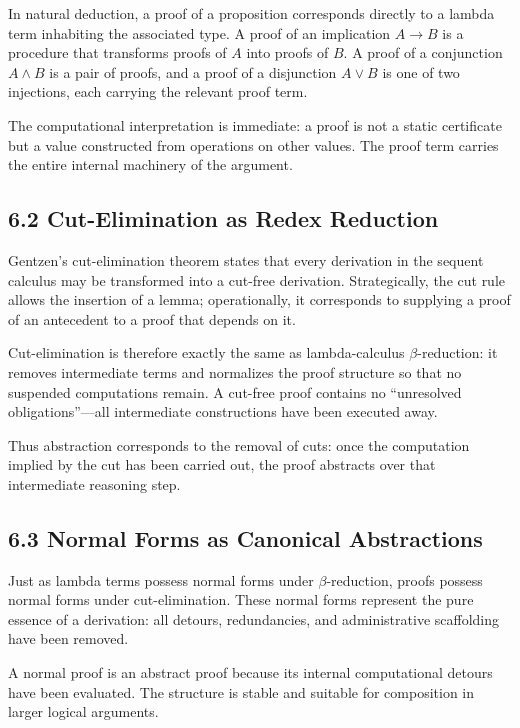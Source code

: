 \documentclass[12pt,letterpaper]{article}
\theoremstyle{remark}
\begin{document}
In natural deduction, a proof of a proposition corresponds directly to a lambda term inhabiting the associated type. A proof of an implication \(A \to B\) is a procedure that transforms proofs of \(A\) into proofs of \(B\). A proof of a conjunction \(A \land B\) is a pair of proofs, and a proof of a disjunction \(A \lor B\) is one of two injections, each carrying the relevant proof term.

The computational interpretation is immediate: a proof is not a static certificate but a value constructed from operations on other values. The proof term carries the entire internal machinery of the argument.

\subsection{6.2 Cut-Elimination as Redex Reduction}

Gentzen’s cut-elimination theorem states that every derivation in the sequent calculus may be transformed into a cut-free derivation. Strategically, the cut rule allows the insertion of a lemma; operationally, it corresponds to supplying a proof of an antecedent to a proof that depends on it.

Cut-elimination is therefore exactly the same as lambda-calculus \(\beta\)-reduction: it removes intermediate terms and normalizes the proof structure so that no suspended computations remain. A cut-free proof contains no ``unresolved obligations''—all intermediate constructions have been executed away.

Thus abstraction corresponds to the removal of cuts: once the computation implied by the cut has been carried out, the proof abstracts over that intermediate reasoning step.

\subsection{6.3 Normal Forms as Canonical Abstractions}

Just as lambda terms possess normal forms under \(\beta\)-reduction, proofs possess normal forms under cut-elimination. These normal forms represent the pure essence of a derivation: all detours, redundancies, and administrative scaffolding have been removed.

A normal proof is an abstract proof because its internal computational detours have been evaluated. The structure is stable and suitable for composition in larger logical arguments.
\end{document}
